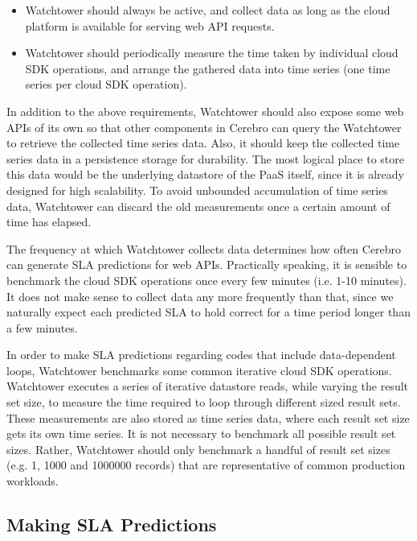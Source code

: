 \begin{itemize}
\item Watchtower should always be active, and collect data as long as the cloud platform is available for serving web API requests.
\item Watchtower should periodically measure the time taken by individual cloud SDK operations, and arrange the gathered data into time series (one time series per cloud SDK operation).
\end{itemize}

In addition to the above requirements, Watchtower should also expose some web APIs of its own 
so that other components in Cerebro can query the Watchtower to retrieve the collected time series data. Also,
it should keep the collected time series data in a persistence storage for durability. The most logical
place to store this data would be the underlying datastore of the PaaS itself, since it is already designed
for high scalability. To avoid unbounded accumulation of time series data, Watchtower can discard the old
measurements once a certain amount of time has elapsed. 

The frequency at which
Watchtower collects data determines how often Cerebro can generate SLA predictions for web APIs. Practically
speaking, it is sensible to benchmark the cloud SDK operations once every few minutes (i.e. 1-10 minutes). It does not make
sense to collect data any more frequently than that, since we naturally expect each predicted SLA to 
hold correct for a time period longer than a few minutes.

In order to make SLA predictions regarding codes that include data-dependent loops, Watchtower
benchmarks some common iterative cloud SDK operations. 
Watchtower executes a series of iterative datastore reads,
while varying the result set size, to measure the time required to loop through different sized result sets. These
measurements are also stored as time series data, where each result set size gets its own time series. 
It is not necessary to benchmark all possible result set sizes. Rather, Watchtower should only benchmark a
handful of result set sizes  (e.g. 1, 1000 and 1000000 records) that are representative of common 
production workloads.

\subsection{Making SLA Predictions}

